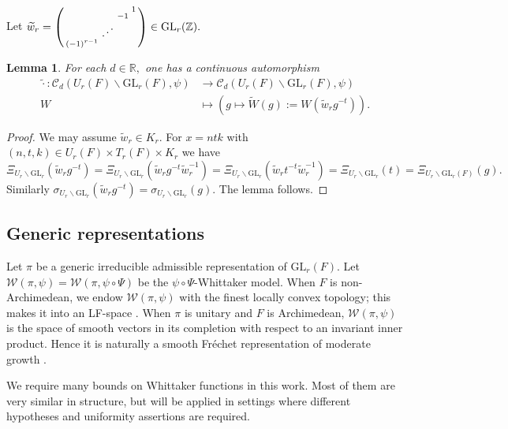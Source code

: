 \documentclass[12pt]{amsart}
\newtheorem{lem}[thm]{Lemma}
\theoremstyle{remark}
\numberwithin{equation}{section}
\newcommand{\GL}{\mathrm{GL}}
\newcommand{\ZZ}{\mathbb{Z}}
\newcommand{\lto}{\longrightarrow}
\newcommand{\RR}{\mathbb{R}}
\theoremstyle{definition}
\newenvironment{psmatrix}
  {\left(\begin{smallmatrix}}
  {\end{smallmatrix}\right)}
\numberwithin{equation}{subsection}
\begin{document}
Let $\widetilde{w}_r=\begin{psmatrix} & & &1\\ & & -1 & \\   & \reflectbox{$\ddots$} & &\\ (-1)^{r-1} & &\end{psmatrix} \in \GL_r(\ZZ).$ 
\begin{lem} \label{lem:tilde:iso}
    For each $d \in \RR,$ one has a continuous automorphism 
    \begin{align*}
        \widetilde{\cdot}:\mathcal{C}_d(U_r(F) \backslash \GL_r(F),\psi) &\lto \mathcal{C}_d(U_r(F) \backslash \GL_r(F),\psi)\\
        W &\longmapsto \left(g \mapsto \widetilde{W}(g):=W\left( \widetilde{w}_r g^{-t}\right)\right).
    \end{align*}
\end{lem}
\begin{proof}
We may assume $\widetilde{w}_r \in K_r.$  
For $x=ntk$ with $(n,t,k) \in U_r(F) \times T_r(F) \times K_r$ we have 
$$
\Xi_{U_r \backslash \GL_r}(\widetilde{w}_rg^{-t})=\Xi_{U_r \backslash \GL_r}(\widetilde{w}_rg^{-t}\widetilde{w}^{-1}_r)=\Xi_{U_r \backslash \GL_r}(\widetilde{w}_r t^{-t}\widetilde{w}^{-1}_r)=\Xi_{U_r \backslash \GL_r}(t)=\Xi_{U_r \backslash \GL_r(F)}(g).
$$
Similarly $\sigma_{U_r \backslash \GL_r}(\widetilde{w}_rg^{-t})=\sigma_{U_r \backslash \GL_r}(g).$  The lemma follows.  
\end{proof}




\subsection{Generic representations} 

Let $\pi$ be a generic irreducible admissible representation of $\GL_r(F)$. Let $\mathcal{W}(\pi,\psi)=\mathcal{W}(\pi,\psi \circ \Psi)$ be the $\psi \circ \Psi$-Whittaker model. When $F$ is non-Archimedean, we endow $\mathcal{W}(\pi,\psi)$ with the finest locally convex topology; this makes it into an LF-space \cite[\S 2.3]{BP:GLn}.
When $\pi$ is unitary and $F$ is Archimedean, $\mathcal{W}(\pi,\psi)$ is the space of smooth vectors in its completion with respect to an invariant inner product.  Hence it is naturally a smooth Fr\'echet representation of moderate growth \cite[Lemma 11.5.1]{Wallach:RGII}.  




We require many bounds on Whittaker functions in this work.  Most of them are very similar in structure, but will be applied in settings where different hypotheses and uniformity assertions are required.  
\end{document}
